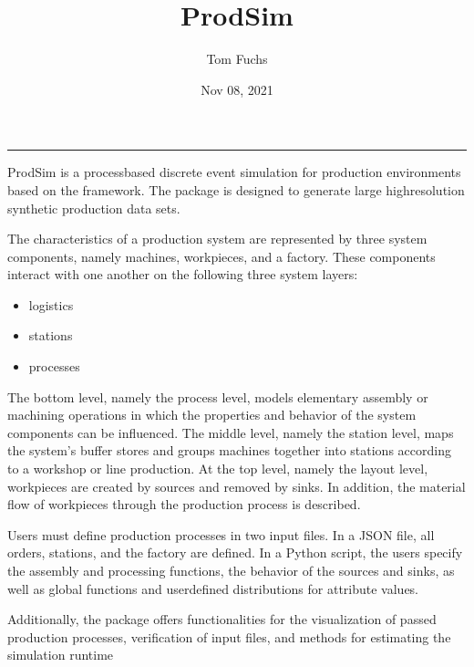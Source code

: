\documentclass[letterpaper,10pt,english]{sphinxmanual}
\title{ProdSim}
\date{Nov 08, 2021}
\author{Tom Fuchs}
\begin{document}
\pagestyle{empty}
\sphinxmaketitle
\pagestyle{plain}
\sphinxtableofcontents
\pagestyle{normal}
\label{\detokenize{index::doc}}
\noindent{}


\bigskip\hrule\bigskip




\sphinxAtStartPar
ProdSim is a process\sphinxhyphen{}based discrete event simulation for production environments based on the
 framework. The package is designed to generate large high\sphinxhyphen{}resolution
synthetic production data sets.

\sphinxAtStartPar
The characteristics of a production system are represented by three system components, namely machines, workpieces, and
a factory. These components interact with one another on the following three system layers:
\begin{itemize}
\item {} 
\sphinxAtStartPar
logistics

\item {} 
\sphinxAtStartPar
stations

\item {} 
\sphinxAtStartPar
processes

\end{itemize}

\sphinxAtStartPar
The bottom level, namely the process level, models elementary assembly or machining operations in which the properties
and behavior of the system components can be influenced. The middle level, namely the station level, maps the system’s
buffer stores and groups machines together into stations according to a workshop or line production. At the top level,
namely the layout level, workpieces are created by sources and removed by sinks. In addition, the material flow of
workpieces through the production process is described.

\sphinxAtStartPar
Users must define production processes in two input files. In a JSON file, all orders, stations, and the factory are
defined. In a Python script, the users specify the assembly and processing functions, the behavior of the sources and
sinks, as well as global functions and user\sphinxhyphen{}defined distributions for attribute values.

\sphinxAtStartPar
Additionally, the package offers functionalities for the visualization of passed production processes, verification of
input files, and methods for estimating the simulation runtime
\end{document}
